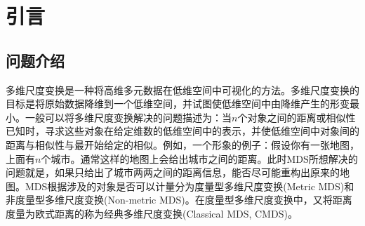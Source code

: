 
\chapter{引言}
\label{cha:introduction}
\section{问题介绍}
多维尺度变换是一种将高维多元数据在低维空间中可视化的方法。多维尺度变换的目标是将原始数据降维到一个低维空间，并试图使低维空间中由降维产生的形变最小。一般可以将多维尺度变换解决的问题描述为：当$n$个对象之间的距离或相似性已知时，寻求这些对象在给定维数的低维空间中的表示，并使低维空间中对象间的距离与相似性与最开始给定的相似。例如，一个形象的例子：假设你有一张地图，上面有$n$个城市。通常这样的地图上会给出城市之间的距离。此时MDS所想解决的问题就是，如果只给出了城市两两之间的距离信息，能否尽可能重构出原来的地图。MDS根据涉及的对象是否可以计量分为度量型多维尺度变换(Metric MDS)和非度量型多维尺度变换(Non-metric MDS)。在度量型多维尺度变换中，又将距离度量为欧式距离的称为经典多维尺度变换(Classical MDS, CMDS)。

